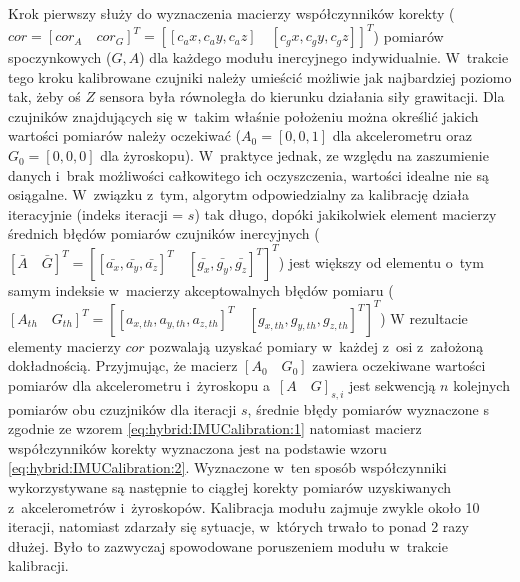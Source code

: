 Krok pierwszy służy do wyznaczenia macierzy współczynników korekty ($cor = [cor_A \quad cor_G]^T = [[c_ax,c_ay,c_az ]\quad[c_gx,c_gy,c_gz ]]^T $) pomiarów spoczynkowych ($G, A$) dla każdego modułu inercyjnego indywidualnie. W~trakcie tego kroku kalibrowane czujniki należy umieścić możliwie jak najbardziej poziomo tak, żeby oś $Z$ sensora była równoległa do kierunku działania siły grawitacji. Dla czujników znajdujących się w~takim właśnie położeniu można określić jakich wartości pomiarów należy oczekiwać ($A_0 = [0,0,1]$ dla akcelerometru oraz $G_0 = [0,0,0]$ dla żyroskopu). W~praktyce jednak, ze względu na zaszumienie danych i~brak możliwości całkowitego ich oczyszczenia, wartości idealne nie są osiągalne. W~związku z~tym, algorytm odpowiedzialny za kalibrację 
działa iteracyjnie (indeks iteracji = $s$) tak długo, dopóki jakikolwiek element macierzy średnich błędów pomiarów czujników inercyjnych ($[\bar{A}\quad \bar{G}]^T = [[\bar{a_x},\bar{a_y},\bar{a_z}]^T\quad[\bar{g_x},\bar{g_y},\bar{g_z}]^T]^T$)
jest większy od elementu o~tym samym indeksie w~macierzy akceptowalnych błędów pomiaru ($[A_{th}\quad G_{th}]^T = [[a_{x,th},a_{y,th},a_{z,th}]^T\quad[g_{x,th},g_{y,th},g_{z,th}]^T]^T $)
W rezultacie elementy macierzy $cor$ pozwalają uzyskać pomiary w~każdej z~osi z~założoną dokładnością.
Przyjmując, że macierz $[A_0\quad G_0]$ zawiera oczekiwane wartości pomiarów dla akcelerometru i~żyroskopu a~$[A\quad G]_{s,i}$ jest sekwencją $n$ kolejnych pomiarów obu czuzjników dla iteracji $s$, średnie błędy pomiarów wyznaczone s zgodnie ze wzorem \eqref{eq:hybrid:IMUCalibration:1} natomiast macierz współczynników korekty wyznaczona jest na podstawie wzoru \eqref{eq:hybrid:IMUCalibration:2}. Wyznaczone w~ten sposób współczynniki wykorzystywane są następnie to ciągłej korekty pomiarów uzyskiwanych z~akcelerometrów i~żyroskopów. Kalibracja modułu zajmuje zwykle około 10 iteracji, natomiast zdarzały się sytuacje, w~których trwało to ponad 2 razy dłużej. Było to zazwyczaj spowodowane poruszeniem modułu w~trakcie kalibracji.

